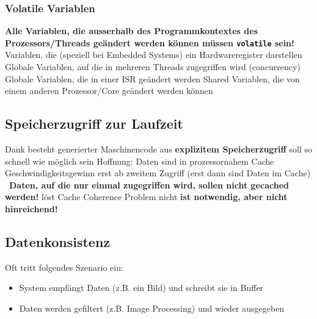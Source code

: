 \subsubsection{Volatile Variablen}

\begin{outline}
    \1 \textbf{Alle Variablen, die ausserhalb des Programmkontextes des Prozessors/Threads geändert werden können müssen \lstinline|volatile| sein!}
        \2 Variablen, die (speziell bei Embedded Systems) ein Hardwareregister darstellen
        \2 Globale Variablen, auf die in mehreren Threads zugegriffen wird (concurrency)
        \2 Globale Variablen, die in einer ISR geändert werden
        \2 Shared Variablen, die von einem anderen Prozessor/Core geändert werden können
\end{outline}


\subsection{Speicherzugriff zur Laufzeit}

\begin{outline}
    \1 Dank  besteht generierter Maschinencode aus \textbf{explizitem Speicherzugriff}
        \2 soll so schnell wie möglich sein
        \2 Hoffnung: Daten sind in prozessornahem Cache
    \1 Geschwindigkeitsgewinn erst ab zweitem Zugriff (erst dann sind Daten im Cache) \\
        \textrightarrow\ \textbf{Daten, auf die nur einmal zugegriffen wird, sollen nicht gecached werden!}
    \1  löst Cache Coherence Problem nicht
        \2 \textbf{ ist notwendig, aber nicht hinreichend!}
\end{outline}


\subsection{Datenkonsistenz}

Oft tritt folgendes Szenario ein: 

\vspace{0.1cm}

\begin{itemize}
    \item System empfängt Daten (z.B. ein Bild) und schreibt sie in Buffer
    \item Daten werden gefiltert (z.B. Image Processing) und wieder ausgegeben
\end{itemize}

